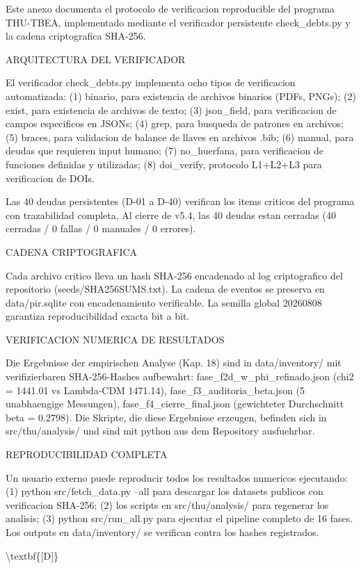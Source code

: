 ﻿\documentclass[11pt,letterpaper]{article}
\begin{document}
Este anexo documenta el protocolo de verificacion reproducible del programa THU-TBEA, implementado mediante el verificador persistente check\_debts.py y la cadena criptografica SHA-256.

ARQUITECTURA DEL VERIFICADOR

El verificador check\_debts.py implementa ocho tipos de verificacion automatizada: (1) binario, para existencia de archivos binarios (PDFs, PNGs); (2) exist, para existencia de archivos de texto; (3) json\_field, para verificacion de campos especificos en JSONs; (4) grep, para busqueda de patrones en archivos; (5) braces, para validacion de balance de llaves en archivos .bib; (6) manual, para deudas que requieren input humano; (7) no\_huerfana, para verificacion de funciones definidas y utilizadas; (8) doi\_verify, protocolo L1+L2+L3 para verificacion de DOIs.

Las 40 deudas persistentes (D-01 a D-40) verifican los items criticos del programa con trazabilidad completa. Al cierre de v5.4, las 40 deudas estan cerradas (40 cerradas / 0 fallas / 0 manuales / 0 errores).

CADENA CRIPTOGRAFICA

Cada archivo critico lleva un hash SHA-256 encadenado al log criptografico del repositorio (seeds/SHA256SUMS.txt). La cadena de eventos se preserva en data/pir.sqlite con encadenamiento verificable. La semilla global 20260808 garantiza reproducibilidad exacta bit a bit.

VERIFICACION NUMERICA DE RESULTADOS

Die Ergebnisse der empirischen Analyse (Kap. 18) sind in data/inventory/ mit verifizierbaren SHA-256-Hashes aufbewahrt: fase_f2d_w_phi_refinado.json (chi2 = 1441.01 vs Lambda-CDM 1471.14), fase_f3_auditoria_beta.json (5 unabhaengige Messungen), fase_f4_cierre_final.json (gewichteter Durchschnitt beta = 0.2798). Die Skripte, die diese Ergebnisse erzeugen, befinden sich in src/thu/analysis/ und sind mit python aus dem Repository ausfuehrbar.

REPRODUCIBILIDAD COMPLETA

Un usuario externo puede reproducir todos los resultados numericos ejecutando: (1) python src/fetch\_data.py --all para descargar los datasets publicos con verificacion SHA-256; (2) los scripts en src/thu/analysis/ para regenerar los analisis; (3) python src/run\_all.py para ejecutar el pipeline completo de 16 fases. Los outputs en data/inventory/ se verifican contra los hashes registrados.

\textbackslash{}textbf\{[D]\}
\end{document}
